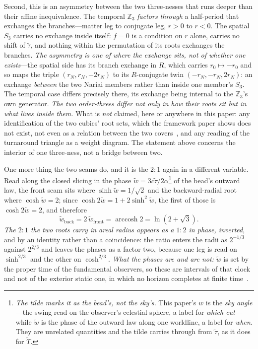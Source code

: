 \documentclass[11pt,a4paper]{article}
\theoremstyle{definition}
\begin{document}
Second, this is an asymmetry between the two three-nesses that runs deeper than their affine inequivalence. The temporal $\mathbb{Z}_{3}$ \emph{factors through} a half-period that exchanges the branches---matter leg to conjugate leg, $r>0$ to $r<0$. The spatial $S_{3}$ carries no exchange inside itself: $f=0$ is a condition on $r$ alone, carries no shift of $\tilde\tau$, and nothing within the permutation of its roots exchanges the branches. \emph{The asymmetry is one of where the exchange sits, not of whether one exists}---the spatial side has its branch exchange in $R$, which carries $r_{0}\mapsto-r_{0}$ and so maps the triple $(r_{N},r_{N},-2r_{N})$ to its $R$-conjugate twin $(-r_{N},-r_{N},2r_{N})$: an exchange \emph{between} the two Nariai members rather than inside one member's $S_{3}$. The temporal case differs precisely there, its exchange being internal to the $\mathbb{Z}_{3}$'s own generator. \emph{The two order-threes differ not only in how their roots sit but in what lives inside them.} What is \emph{not} claimed, here or anywhere in this paper: any identification of the two cubics' root sets, which the framework paper shows does not exist, not even as a relation between the two covers~\cite{JanzenCRframework}, and any reading of the turnaround triangle as a weight diagram. The statement above concerns the interior of one three-ness, not a bridge between two.

One more thing the two seams do, and it is the $2{:}1$ again in a different variable. Read along the closed slicing in the phase $\tilde{w}=3c\tilde\tau/2\alpha$\footnote{\emph{The tilde marks it as the bead's, not the sky's.} This paper's $w$ is the \emph{sky angle}---the swing read on the observer's celestial sphere, a label for \emph{which cut}---while $\tilde{w}$ is the phase of the outward law along one worldline, a label for \emph{when}. They are unrelated quantities and the tilde carries through from $\tilde\tau$, as it does for $\widetilde{T}$.} of the bead's outward law, the front seam sits where $\sinh \tilde{w}=1/\sqrt2$ and the backward-radial root where $\cosh \tilde{w}=2$; since $\cosh 2\tilde{w}=1+2\sinh^{2}\tilde{w}$, the first of those is $\cosh 2\tilde{w}=2$, and therefore
\begin{equation}
  \tilde{w}_{\text{back}}=2\,\tilde{w}_{\text{front}}=\operatorname{arccosh}2=\ln(2+\sqrt3).
  \label{eq:seamphases}
\end{equation}
\emph{The $2{:}1$ the two roots carry in areal radius appears as a $1{:}2$ in phase, inverted}, and by an identity rather than a coincidence: the ratio enters the radii as $2^{-1/3}$ against $2^{2/3}$ and leaves the phases as a factor two, because one leg is read on $\sinh^{2/3}$ and the other on $\cosh^{2/3}$. \emph{What the phases are and are not:} $\tilde{w}$ is set by the proper time of the fundamental observers, so these are intervals of that clock and not of the exterior static one, in which no horizon completes at finite time~\cite{JanzenBHcausality,JanzenCRframework}.
\end{document}

